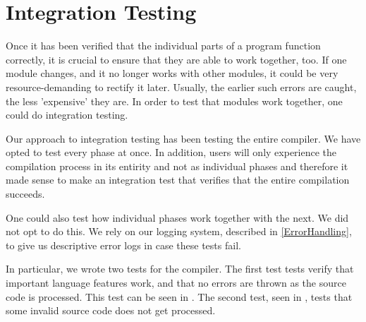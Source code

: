 \section{Integration Testing} \label{sec:IntTesting}
Once it has been verified that the individual parts of a program function correctly, it is crucial to ensure that they are able to work together, too.
If one module changes, and it no longer works with other modules, it could be very resource-demanding to rectify it later.
Usually, the earlier such errors are caught, the less 'expensive' they are.
In order to test that modules work together, one could do integration testing.

Our approach to integration testing has been testing the entire compiler. We have opted to test every phase at once. In addition, users will only experience the compilation process in its entirity and not as individual phases and therefore it made sense to make an integration test that verifies that the entire compilation succeeds.

One could also test how individual phases work together with the next. We did not opt to do this. We rely on our logging system, described in \ref{ErrorHandling}, to give us descriptive error logs in case these tests fail.

In particular, we wrote two tests for the \dazel{} compiler. The first test tests verify that important language features work, and that no errors are thrown as the source code is processed. This test can be seen in . The second test, seen in , tests that some invalid source code does not get processed.

